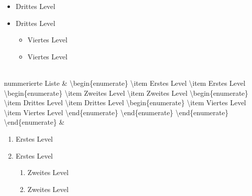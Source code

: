 \begin{table}[h]
\begin{tabu}
\begin{itemize}
\begin{itemize}
\begin{itemize}
																		\item Drittes Level
																		\item Drittes Level
																		\begin{itemize}
																			\item Viertes Level
																			\item Viertes Level
																		\end{itemize}
																	\end{itemize}
																\end{itemize}
																\end{itemize}\\%
nummerierte\newline
Liste			 	& \textbackslash begin\{enumerate\}\newline
					\textbackslash item Erstes Level\newline
					\textbackslash item Erstes Level\newline
					\textbackslash begin\{enumerate\}\newline
					\textbackslash item Zweites Level\newline
					\textbackslash item Zweites Level\newline
					\textbackslash begin\{enumerate\}\newline
					\textbackslash item Drittes Level\newline
					\textbackslash item Drittes Level\newline
					\textbackslash begin\{enumerate\}\newline
					\textbackslash item Viertes Level\newline
					\textbackslash item Viertes Level\newline
					\textbackslash end\{enumerate\}\newline
					\textbackslash end\{enumerate\}\newline
					\textbackslash end\{enumerate\}\newline
					\textbackslash end\{enumerate\}				& \begin{enumerate}
																\item Erstes Level
																\item Erstes Level
																\begin{enumerate}
																	\item Zweites Level
																	\item Zweites Level
																	\begin{enumerate}

\end{enumerate}
\end{enumerate}
\end{enumerate}
\end{tabu}
\end{table}
